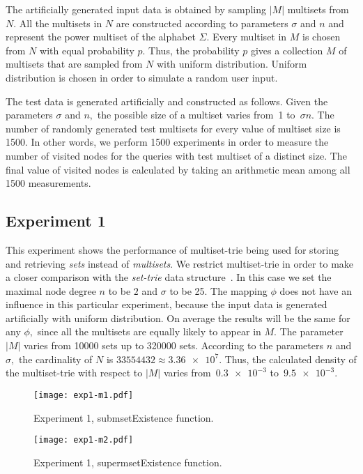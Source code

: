 The artificially generated input data is obtained by sampling $|M|$ multisets 
from $N.$ All the multisets in $N$ are constructed according to parameters 
$\sigma$ and $n$ and represent the power multiset of the alphabet $\Sigma.$ 
Every multiset in $M$ is chosen from $N$ with equal probability $p.$ Thus, the 
probability $p$ gives a collection $M$ of multisets that are sampled from $N$ 
with uniform distribution. Uniform distribution is chosen in order to simulate a 
random user input.

The test data is generated artificially and constructed as follows. Given the 
parameters $\sigma$ and $n,$ the possible size of a multiset varies from~1 
to~$\sigma n.$ The number of randomly generated test multisets for every 
value of multiset size is 1500. In other words, we perform 1500 experiments 
in order to measure the number of visited nodes for the queries with test multiset 
of a distinct size. The final value of visited nodes is calculated by taking an 
arithmetic mean among all 1500 measurements.


\subsection{Experiment 1} \label{s:exp1}
This experiment shows the performance of multiset-trie being used for storing 
and retrieving \emph{sets} instead of \emph{multisets}. We restrict multiset-trie in order 
to make a closer comparison with the \emph{set-trie} data structure~\cite{savnik2013index}.
In this case we set the maximal node degree $n$ to be $2$ and $\sigma$ to be 25. 
The mapping $\phi$ does not have an influence in this particular experiment, 
because the input data is generated artificially with uniform distribution. On 
average the results will be the same for any $\phi,$ since all the multisets are 
equally likely to appear in $M.$ The parameter $|M|$ varies from 10000 sets up 
to 320000 sets. According to the parameters $n$ and $\sigma,$ the cardinality of 
$N$ is $33554432\approx \num{3.36e+7}.$ Thus, the calculated density of the 
multiset-trie with respect to $|M|$ varies from~$\num{0.3e-3}$ to~$\num{9.5e-3}.$


\begin{figure}
\center
\texttt{[image: exp1-m1.pdf]}
\caption{Experiment 1, submsetExistence function.}
\label{fig:e1m1}
\end{figure}

\begin{figure}
\center
\texttt{[image: exp1-m2.pdf]}
\caption{Experiment 1, supermsetExistence function.}
\label{fig:e1m2}
\end{figure}


